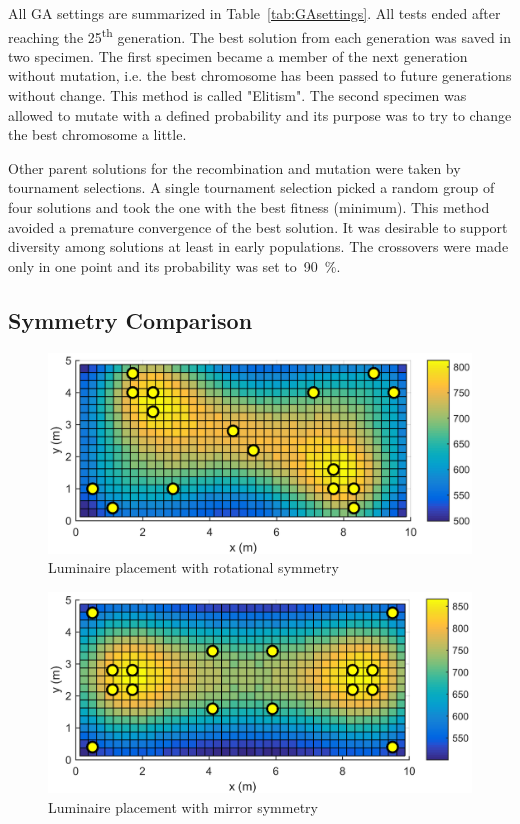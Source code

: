 All GA settings are summarized in Table~\ref{tab:GAsettings}. All tests ended after reaching the 25\textsuperscript{th} generation. The best solution from each generation was saved in two specimen. The first specimen became a member of the next generation without mutation, i.e. the best chromosome has been passed to future generations without change. This method is called "Elitism". The second specimen was allowed to mutate with a defined probability and its purpose was to try to change the best chromosome a little.

Other parent solutions for the recombination and mutation were taken by tournament selections. A single tournament selection picked a random group of four solutions and took the one with the best fitness (minimum). This method avoided a premature convergence of the best solution. It was desirable to support diversity among solutions at least in early populations. The crossovers were made only in one point and its probability was set to~90~\%.

\subsection{Symmetry Comparison}

\begin{figure}[b]
  \centering
  \includegraphics[width=\columnwidth]{MSTR_SLB_4x18W_5G4_Fit2_V010_S0}
  \caption{Luminaire placement with rotational symmetry}
  \label{fig:V010_S0}
\end{figure}

\begin{figure}[b]
  \centering
  \includegraphics[width=\columnwidth]{../Vysledky/MSTR_SLB_4x18W_5G4_Fit2_V010_S1}
  \caption{Luminaire placement with mirror symmetry}
  \label{fig:V010_S1}
\end{figure}

